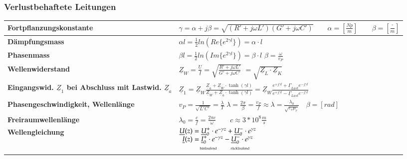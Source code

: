 	\subsubsection{Verlustbehaftete Leitungen}
		\renewcommand{\arraystretch}{1.5}
		\begin{tabular}{| p{6cm} | l |}
			\hline
				\textbf{Fortpflanzungskonstante}
				& $\gamma=\alpha+j\beta=\sqrt{(R'+j\omega L')(G'+j\omega C')}\qquad
				\alpha=[\frac{Np}{m}] \qquad \beta=[\frac{^\circ}{m}]$\\
			\hline
				\textbf{Dämpfungsmass}
				& $\alpha l= \frac{1}{2}ln(Re\{e^{2\gamma l}\})=\alpha\cdot l$\\
			\hline
				\textbf{Phasenmass}
				& $\beta l=\frac{1}{2}ln(Im\{e^{2\gamma l}\})= \beta\cdot l$ \qquad
				$\beta=\frac{\omega}{v_P}$\\
			\hline
				\textbf{Wellenwiderstand}
				& $\underline{Z}_W=\frac{\underline{U}}{\underline{I}}=\sqrt{\frac{R'+j\omega L'}{G'+j\omega C'}}$
				$=\sqrt{\underline{Z}_L \cdot \underline{Z}_K}$\\
			\hline
				\textbf{Eingangswid. $\underline{Z}_1$  bei Abschluss mit
				Lastwid. $\underline{Z}_a$} &
				$\underline{Z}_1 = \underline{Z}_W
				\frac{\underline{Z}_a+\underline{Z}_W \cdot \tanh(\gamma
				l)}{\underline{Z}_W+\underline{Z}_a \cdot \tanh(\gamma l)}
				= \underline{Z}_W \frac{e^{+j \gamma l} + \underline{\Gamma}_{Last} e^{- j \gamma l}}
				{e^{+j \gamma l} - \underline{\Gamma}_{Last} e^{- j \gamma l}}$\\
			\hline
				\textbf{Phasengeschwindigkeit, Wellenlänge}
				& $v_P=\frac{1}{\sqrt{L'C'}}=\frac{\lambda}{T}$ \qquad
				\qquad $\lambda=\frac{2\pi}{\beta}=\frac{v_P}{f} \approx
				\lambda=\frac{\lambda_0}{\sqrt{\varepsilon_r \mu_r}} \quad \beta=[rad]$\\
			\hline
				\textbf{Freiraumwellenlänge}
				& $\lambda_0=\frac{c}{f}=\frac{2\pi c}{\omega} \qquad c\approx 3*10^8 \frac{m}{s}$\\
			\hline
				\textbf{Wellengleichung}
				& $\begin{matrix}
                   	\underline{U}(z)=\underline{U}^+_0 \cdot e^{-\gamma z} + \underline{U}^-_0 \cdot e^{\gamma z}\\
                   	\underline{I}(z)=\underline{I}^+_0 \cdot e^{-\gamma z} - \underline{U}^-_0 \cdot e^{\gamma z}\\
                   	\qquad \text{\tiny hinlaufend}\qquad\text{\tiny rücklaufend}
                \end{matrix}$\\

\end{tabular}
